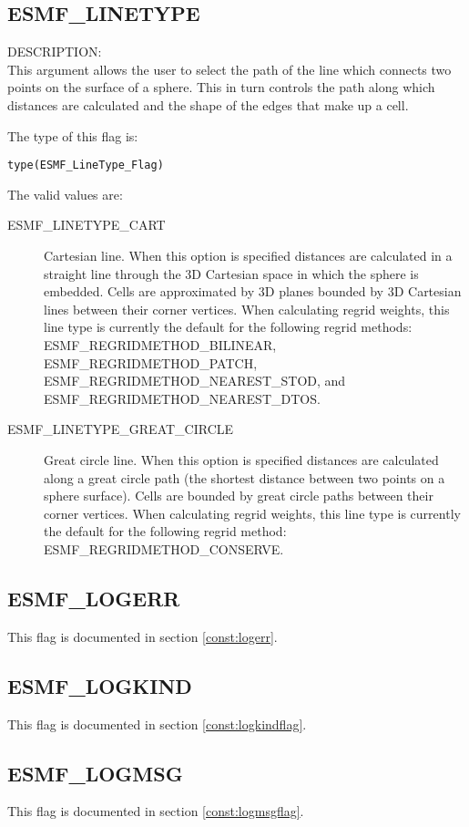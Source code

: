 \subsection{ESMF\_LINETYPE}
\label{opt:lineType}

{\sf DESCRIPTION:\\}  This argument allows the user to select the path of the line which connects two points on the surface of a sphere.
This in turn controls the path along which distances are calculated and the shape of the edges that make up a cell. 

The type of this flag is:

{\tt type(ESMF\_LineType\_Flag)}

The valid values are:
\begin{description}
\item [ESMF\_LINETYPE\_CART]
   Cartesian line. When this option is specified distances are calculated in a straight line through the 3D Cartesian space
   in which the sphere is embedded. Cells are approximated by 3D planes bounded by 3D Cartesian lines between their corner vertices. 
   When calculating regrid weights, this line type is currently the default for the following regrid methods: ESMF\_REGRIDMETHOD\_BILINEAR, 
   ESMF\_REGRIDMETHOD\_PATCH, ESMF\_REGRIDMETHOD\_NEAREST\_STOD, and  ESMF\_REGRIDMETHOD\_NEAREST\_DTOS.
\item [ESMF\_LINETYPE\_GREAT\_CIRCLE]
   Great circle line. When this option is specified distances are calculated along a great circle path (the shortest distance
   between two points on a sphere surface). Cells are bounded by great circle paths between their corner vertices. When calculating regrid 
   weights, this line type is currently the default for the following regrid method: ESMF\_REGRIDMETHOD\_CONSERVE. 
\end{description}


\subsection{ESMF\_LOGERR}
This flag is documented in section \ref{const:logerr}.

\subsection{ESMF\_LOGKIND}
This flag is documented in section \ref{const:logkindflag}.

\subsection{ESMF\_LOGMSG}
This flag is documented in section \ref{const:logmsgflag}.

